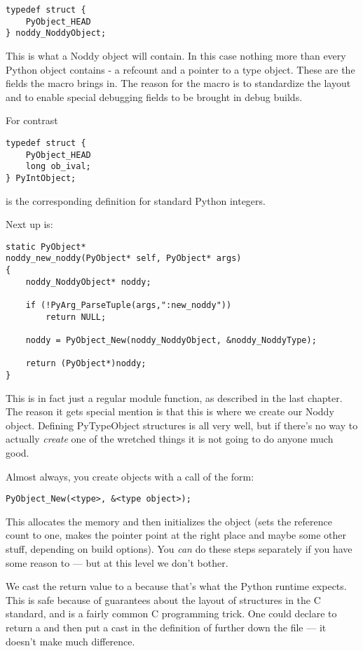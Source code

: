 \begin{verbatim}
typedef struct {
    PyObject_HEAD
} noddy_NoddyObject;
\end{verbatim}

This is what a Noddy object will contain.  In this case nothing more
than every Python object contains - a refcount and a pointer to a type
object.  These are the fields the  macro brings
in.  The reason for the macro is to standardize the layout and to
enable special debugging fields to be brought in debug builds.

For contrast

\begin{verbatim}
typedef struct {
    PyObject_HEAD
    long ob_ival;
} PyIntObject;
\end{verbatim}

is the corresponding definition for standard Python integers.

Next up is:

\begin{verbatim}
static PyObject*
noddy_new_noddy(PyObject* self, PyObject* args)
{
    noddy_NoddyObject* noddy;

    if (!PyArg_ParseTuple(args,":new_noddy")) 
        return NULL;

    noddy = PyObject_New(noddy_NoddyObject, &noddy_NoddyType);

    return (PyObject*)noddy;
}
\end{verbatim}

This is in fact just a regular module function, as described in the
last chapter.  The reason it gets special mention is that this is
where we create our Noddy object.  Defining PyTypeObject structures is
all very well, but if there's no way to actually \emph{create} one
of the wretched things it is not going to do anyone much good.

Almost always, you create objects with a call of the form:

\begin{verbatim}
PyObject_New(<type>, &<type object>);
\end{verbatim}

This allocates the memory and then initializes the object (sets
the reference count to one, makes the  pointer point at
the right place and maybe some other stuff, depending on build options).
You \emph{can} do these steps separately if you have some reason to
--- but at this level we don't bother.

We cast the return value to a  because that's what
the Python runtime expects.  This is safe because of guarantees about
the layout of structures in the C standard, and is a fairly common C
programming trick.  One could declare  to
return a  and then put a cast in the
definition of  further down the file --- it
doesn't make much difference.

